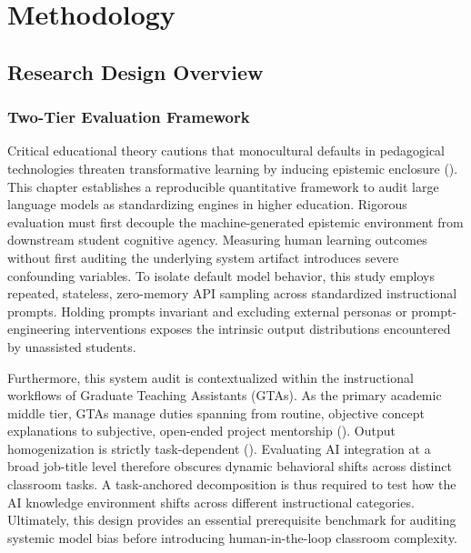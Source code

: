 

\chapter{Methodology}
\section{Research Design Overview}

\subsection{Two-Tier Evaluation Framework}
Critical educational theory cautions that monocultural defaults in pedagogical technologies threaten transformative learning by inducing epistemic enclosure (\cite{Warren2020}). This chapter establishes a reproducible quantitative framework to audit large language models as standardizing engines in higher education. Rigorous evaluation must first decouple the machine-generated epistemic environment \cite{Santos2014} from downstream student cognitive agency. Measuring human learning outcomes without first auditing the underlying system artifact introduces severe confounding variables. To isolate default model behavior, this study employs repeated, stateless, zero-memory API sampling across standardized instructional prompts. Holding prompts invariant and excluding external personas or prompt-engineering interventions exposes the intrinsic output distributions encountered by unassisted students. 

Furthermore, this system audit is contextualized within the instructional workflows of Graduate Teaching Assistants (GTAs). As the primary academic middle tier, GTAs manage duties spanning from routine, objective concept explanations to subjective, open-ended project mentorship (\cite{Bousquet2008, Muzaka2009}). Output homogenization is strictly task-dependent (\cite{Jain2025}). Evaluating AI integration at a broad job-title level therefore obscures dynamic behavioral shifts across distinct classroom tasks. A task-anchored decomposition is thus required to test how the AI knowledge environment shifts across different instructional categories. Ultimately, this design provides an essential prerequisite benchmark for auditing systemic model bias before introducing human-in-the-loop classroom complexity.

